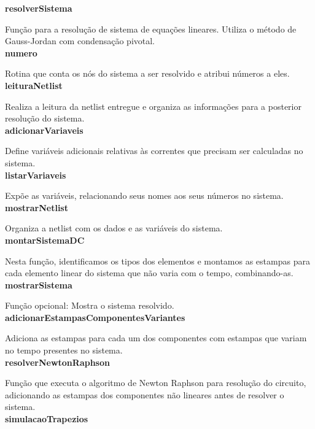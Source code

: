 \documentclass[12pt]{article}
\begin{document}
  \textbf{resolverSistema}

  Função para a resolução de sistema de equações lineares. Utiliza o método de Gauss-Jordan com condensação pivotal.\\

  \textbf{numero}

  Rotina que conta os nós do sistema a ser resolvido e atribui números a eles.\\

  \textbf{leituraNetlist}

  Realiza a leitura da netlist entregue e organiza as informações para a posterior resolução do sistema.\\

  \textbf{adicionarVariaveis}

  Define variáveis adicionais relativas às correntes que precisam ser calculadas no sistema.\\

  \textbf{listarVariaveis}

  Expõe as variáveis, relacionando seus nomes aos seus números no sistema.\\

  \textbf{mostrarNetlist}

  Organiza a netlist com os dados e as variáveis do sistema.\\

  \textbf{montarSistemaDC}

  Nesta função, identificamos os tipos dos elementos e montamos as estampas para cada elemento linear do sistema que não varia com o tempo, combinando-as.\\

  \textbf{mostrarSistema}

  Função opcional: Mostra o sistema resolvido.\\

  \textbf{adicionarEstampasComponentesVariantes}

  Adiciona as estampas para cada um dos componentes com estampas que variam no tempo presentes no sistema.\\

  \textbf{resolverNewtonRaphson}

  Função que executa o algoritmo de Newton Raphson para resolução do circuito, adicionando as estampas dos componentes não lineares antes de resolver o sistema.\\

  \textbf{simulacaoTrapezios}
\end{document}
